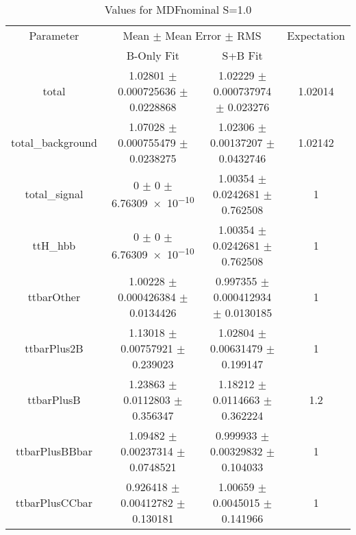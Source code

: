 \begin{table}
\centering
\caption{Values for MDFnominal S=1.0}
\begin{tabular}{cccc}
\toprule
Parameter & \multicolumn{2}{c}{Mean $\pm$ Mean Error $\pm$ RMS} & Expectation\\
 & B-Only Fit & S+B Fit & \\
\midrule
total & \num{1.02801} $\pm$ \num{0.000725636} $\pm$ \num{0.0228868} & \num{1.02229} $\pm$ \num{0.000737974} $\pm$ \num{0.023276} & \num{1.02014}\\
total\_background & \num{1.07028} $\pm$ \num{0.000755479} $\pm$ \num{0.0238275} & \num{1.02306} $\pm$ \num{0.00137207} $\pm$ \num{0.0432746} & \num{1.02142}\\
total\_signal & \num{0} $\pm$ \num{0} $\pm$ \num{6.76309e-10} & \num{1.00354} $\pm$ \num{0.0242681} $\pm$ \num{0.762508} & \num{1}\\
ttH\_hbb & \num{0} $\pm$ \num{0} $\pm$ \num{6.76309e-10} & \num{1.00354} $\pm$ \num{0.0242681} $\pm$ \num{0.762508} & \num{1}\\
ttbarOther & \num{1.00228} $\pm$ \num{0.000426384} $\pm$ \num{0.0134426} & \num{0.997355} $\pm$ \num{0.000412934} $\pm$ \num{0.0130185} & \num{1}\\
ttbarPlus2B & \num{1.13018} $\pm$ \num{0.00757921} $\pm$ \num{0.239023} & \num{1.02804} $\pm$ \num{0.00631479} $\pm$ \num{0.199147} & \num{1}\\
ttbarPlusB & \num{1.23863} $\pm$ \num{0.0112803} $\pm$ \num{0.356347} & \num{1.18212} $\pm$ \num{0.0114663} $\pm$ \num{0.362224} & \num{1.2}\\
ttbarPlusBBbar & \num{1.09482} $\pm$ \num{0.00237314} $\pm$ \num{0.0748521} & \num{0.999933} $\pm$ \num{0.00329832} $\pm$ \num{0.104033} & \num{1}\\
ttbarPlusCCbar & \num{0.926418} $\pm$ \num{0.00412782} $\pm$ \num{0.130181} & \num{1.00659} $\pm$ \num{0.0045015} $\pm$ \num{0.141966} & \num{1}\\
\bottomrule
\end{tabular}
\end{table}